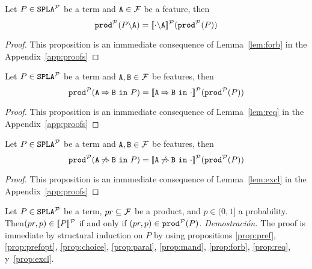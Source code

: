 \bprop\label{prop:forb}
  Let $P\in\fodaPAp$ be a term and $\feature{A}\in\calF$ be a feature, then
  $$\prodp(\forbid{A}{P})=\semdenp{\forbid{A}{\cdot}}(\prodp(P))$$
\begin{proof}
  This proposition is an inmmediate consequence of
  Lemma~\ref{lem:forb} in the Appendix~\ref{app:proofs}
\end{proof}
\eprop

\bprop\label{prop:req}
  Let $P\in\fodaPAp$ be a term and $\feature{A},\feature{B}\in\calF$
  be features, then
  \begin{displaymath}
    \prodp(\require{A}{B}{P})=\semdenp{\require{A}{B}{\cdot}}(\prodp(P))
  \end{displaymath}
\begin{proof}
  This proposition is an inmmediate consequence of
  Lemma~\ref{lem:req} in the Appendix~\ref{app:proofs}
\end{proof}
\eprop

\bprop\label{prop:excl}
  Let $P\in\fodaPAp$ be a term and $\feature{A},\feature{B}\in\calF$
  be features, then
  \begin{displaymath}
    \prodp(\exclude{A}{B}{P})=\semdenp{\exclude{A}{B}{\cdot}}(\prodp(P))
  \end{displaymath}
\begin{proof}
  This proposition is an inmmediate consequence of
  Lemma~\ref{lem:excl} in the Appendix~\ref{app:proofs}
\end{proof}
\eprop

\bthm\label{prop:equivprob}
  Let $P\in\fodaPAp$ be a term, $pr\subseteq\calF$ be a product, and
  $p\in(0,1]$ a probability. Then$ (pr,p)\in\semdenp{P}$ if and only if
  $(pr,p)\in\prodp(P)$.
  \textit{Demostración.}
  The proof is immediate by structural induction on $P$ by using propositions
  \ref{prop:pref}, \ref{prop:prefopt}, \ref{prop:choice},
    \ref{prop:paral},  \ref{prop:mand}, \ref{prop:forb}, \ref{prop:req}, y~\ref{prop:excl}.
\ethm


  
